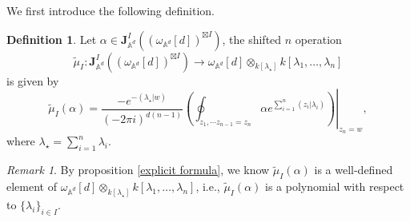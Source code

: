 \documentclass[11pt]{amsart}
\theoremstyle{definition}
\newtheorem{defn}[thm]{Definition}
\theoremstyle{remark}
\newtheorem{rem}[thm]{Remark}
\numberwithin{equation}{section}
\begin{document}
We first introduce the following definition.
\begin{defn}
    Let $\alpha\in \mathbf{J}^{ I}_{\mathbb{A}^{d}}((\omega_{\mathbb{A}^{d}}[d])^{\boxtimes I})$, the shifted $n$ operation
    $$
    \tilde{\mu}_{ I}:\mathbf{J}^{ I}_{\mathbb{A}^{d}}((\omega_{\mathbb{A}^{d}}[d])^{\boxtimes I})\rightarrow \omega_{\mathbb{A}^{d}}[d]\otimes_{k[\lambda_{\star}]}k[\lambda_{1},\dots,\lambda_{n}]
    $$
    is given by
    $$
    \tilde{\mu}_{ I}(\alpha)=\frac{-e^{-(\lambda_{\star}| w)}}{(-2\pi i)^{d(n-1)}}\left.\left(\oint_{z_{1},\cdots z_{n-1}=z_{n}}\alpha e^{\sum\limits_{i=1}^{n}(z_{i}|\lambda_{i})}\right)\right|_{z_n=w},
    $$
    where $\lambda_{\star}=\sum\limits_{i=1}^{n}\lambda_{i}$.
\end{defn}
\begin{rem}
    By proposition \ref{explicit formula}, we know $\tilde{\mu}_{ I}(\alpha)$ is a well-defined element of $\omega_{\mathbb{A}^{d}}[d]\otimes_{k[\lambda_{\star}]}k[\lambda_{1},\dots,\lambda_{n}]$, i.e., $\tilde{\mu}_{ I}(\alpha)$ is a polynomial with respect to $\{\lambda_{i}\}_{i\in I}$.
\end{rem}
\end{document}
